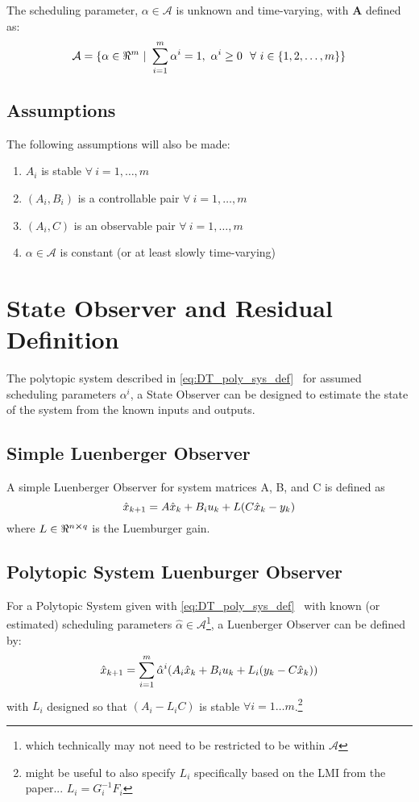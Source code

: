 \documentclass[]{article}
\begin{document}
The scheduling parameter, $\alpha \in \mathcal{A}$ is unknown and time-varying, with $\mathbf{A}$ defined as:
\begin{equation}\label{eq:alpha_set}
	\mathcal{A} = \{\alpha\in \real^m \ | \ \sum_{i=1}^m \alpha^i = 1, \ \alpha^i \geq 0 \ \ \forall \ i \in \{1,2,\dots,m\}\}
\end{equation}


\subsection{Assumptions}
The following assumptions will also be made:

\begin{enumerate}
	\item $A_i$ is stable $\forall \ i = 1, \dots, m$
	\item $(A_i, B_i)$ is a controllable pair $\forall \ i = 1, \dots, m$
	\item $(A_i, C)$ is an observable pair $\forall \ i = 1, \dots, m$
	\item $\alpha \in \mathcal{A}$ is constant (or at least slowly time-varying)
\end{enumerate}


\newpage
\section{State Observer and Residual Definition}
The polytopic system described in \eqref{eq:DT_poly_sys_def} \ for assumed scheduling parameters $\alpha^i$, a State Observer can be designed to estimate the state of the system from the known inputs and outputs.\\

\subsection{Simple Luenberger Observer}
A simple Luenberger Observer for system matrices A, B, and C is defined as
\begin{equation}\label{eq:simple_L_Observer}
	\hat{x}_{k+1} = A \hat{x}_k + B_i u_k + L \qty(C \hat{x}_k - y_k)
\end{equation}
where $L \in \real^{n \cross q}$ is the Luemburger gain.

\subsection{Polytopic System Luenburger Observer}
For a Polytopic System given with \eqref{eq:DT_poly_sys_def} \ with known (or estimated) scheduling parameters $\hat{\alpha} \in \mathcal{A}$\footnote{which technically may not need to be restricted to be within $\mathcal{A}$}, a Luenberger Observer can be defined by:
\begin{equation}\label{eq:DT_poly_l_observer}
	\hat{x}_{k+1} = \sum_{i=1}^m \hat{\alpha}^i \qty(A_i \hat{x}_k + B_i u_k + L_i \qty(y_k - C \hat{x}_k))
\end{equation}
with $L_i$ designed so that $(A_i - L_i C)$ is stable $\forall i = 1 \dots m$.\footnote{might be useful to also specify $L_i$ specifically based on the LMI from the paper... $L_i = G_i^{-1} F_i$}
\end{document}
